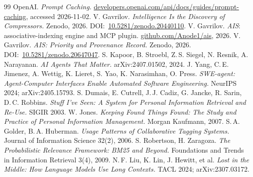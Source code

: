 \documentclass[11pt]{article}
\begin{document}
\begin{thebibliography}{99}
 OpenAI. \emph{Prompt Caching.} \href{https://developers.openai.com/api/docs/guides/prompt-caching}{developers.openai.com/api/docs/guides/prompt-caching}, accessed 2026-11-02.
 V. Gavrilov. \emph{Intelligence Is the Discovery of Compressors.} Zenodo, 2026.
DOI:~\href{https://doi.org/10.5281/zenodo.20440110}{10.5281/zenodo.20440110}.
 V. Gavrilov. \emph{AIS}: associative-indexing engine and MCP plugin.
\href{https://github.com/Anode1/ais}{github.com/Anode1/ais}, 2026.
 V. Gavrilov. \emph{AIS: Priority and Provenance Record.} Zenodo, 2026.
DOI:~\href{https://doi.org/10.5281/zenodo.20647047}{10.5281/zenodo.20647047}.
 S. Kapoor, B. Stroebl, Z.\,S. Siegel, N. Resnik, A. Narayanan. \emph{AI Agents That Matter.} arXiv:2407.01502, 2024.
 J. Yang, C.\,E. Jimenez, A. Wettig, K. Lieret, S. Yao, K. Narasimhan, O. Press. \emph{SWE-agent: Agent-Computer Interfaces Enable Automated Software Engineering.} NeurIPS 2024; arXiv:2405.15793.
 S. Dumais, E. Cutrell, J.\,J. Cadiz, G. Jancke, R. Sarin, D.\,C. Robbins. \emph{Stuff I've Seen: A System for Personal Information Retrieval and Re-Use.} SIGIR 2003.
 W. Jones. \emph{Keeping Found Things Found: The Study and Practice of Personal Information Management.} Morgan Kaufmann, 2007.
 S.\,A. Golder, B.\,A. Huberman. \emph{Usage Patterns of Collaborative Tagging Systems.} Journal of Information Science 32(2), 2006.
 S. Robertson, H. Zaragoza. \emph{The Probabilistic Relevance Framework: BM25 and Beyond.} Foundations and Trends in Information Retrieval 3(4), 2009.
 N.\,F. Liu, K. Lin, J. Hewitt, et al. \emph{Lost in the Middle: How Language
Models Use Long Contexts.} TACL 2024; arXiv:2307.03172.
\end{thebibliography}
\end{document}
